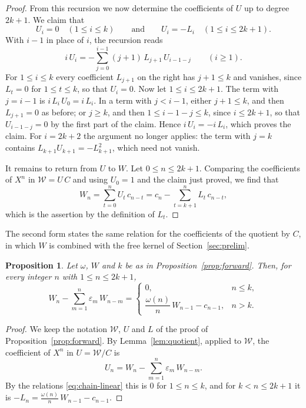 \documentclass{amsart}
\newtheorem{proposition}[theorem]{Proposition}
\theoremstyle{definition}
\theoremstyle{remark}
\numberwithin{equation}{section}
\begin{document}
\begin{proof}
From this recursion we now determine the coefficients of $U$ up to degree $2k+1$. We claim that
\begin{equation}\label{eq:chain-linear}
U_i=0\quad(1\le i\le k)\qquad\text{and}\qquad U_i=-L_i\quad(1\le i\le 2k+1).
\end{equation}
With $i-1$ in place of $i$, the recursion reads
\[
i\,U_i=-\sum_{j=0}^{i-1}(j+1)\,L_{j+1}\,U_{i-1-j}\qquad(i\ge 1).
\]
For $1\le i\le k$ every coefficient $L_{j+1}$ on the right has $j+1\le k$ and vanishes, since $L_t=0$ for $1\le t\le k$, so that $U_i=0$. Now let $1\le i\le 2k+1$. The term with $j=i-1$ is $i\,L_i\,U_0=i\,L_i$. In a term with $j<i-1$, either $j+1\le k$, and then $L_{j+1}=0$ as before; or $j\ge k$, and then $1\le i-1-j\le k$, since $i\le 2k+1$, so that $U_{i-1-j}=0$ by the first part of the claim. Hence $i\,U_i=-i\,L_i$, which proves the claim. For $i=2k+2$ the argument no longer applies: the term with $j=k$ contains $L_{k+1}U_{k+1}=-L_{k+1}^2$, which need not vanish.

It remains to return from $U$ to $W$. Let $0\le n\le 2k+1$. Comparing the coefficients of $X^n$ in $\mathcal{W}=U\,C$ and using $U_0=1$ and the claim just proved, we find that
\[
W_n=\sum_{t=0}^{n}U_t\,c_{n-t}=c_n-\sum_{t=k+1}^{n}L_t\,c_{n-t},
\]
which is the assertion by the definition of $L_t$.
\end{proof}

The second form states the same relation for the coefficients of the quotient by $C$, in which $W$ is combined with the free kernel of Section~\ref{sec:prelim}.

\begin{proposition}\label{prop:quotientform}
Let $\omega$, $W$ and $k$ be as in Proposition~\ref{prop:forward}. Then, for every integer $n$ with $1\le n\le 2k+1$,
\[
W_n-\sum_{m=1}^{n}\varepsilon_m\,W_{n-m}=
\begin{cases}
0, & n\le k,\\[4pt]
\dfrac{\omega(n)}{n}\,W_{n-1}-c_{n-1}, & n>k.
\end{cases}
\]
\end{proposition}

\begin{proof}
We keep the notation $\mathcal{W}$, $U$ and $L$ of the proof of Proposition~\ref{prop:forward}. By Lemma~\ref{lem:quotient}, applied to $\mathcal{W}$, the coefficient of $X^n$ in $U=\mathcal{W}/C$ is
\[
U_n=W_n-\sum_{m=1}^{n}\varepsilon_m\,W_{n-m}.
\]
By the relations \eqref{eq:chain-linear} this is $0$ for $1\le n\le k$, and for $k<n\le 2k+1$ it is $-L_n=\frac{\omega(n)}{n}\,W_{n-1}-c_{n-1}$.
\end{proof}
\end{document}
